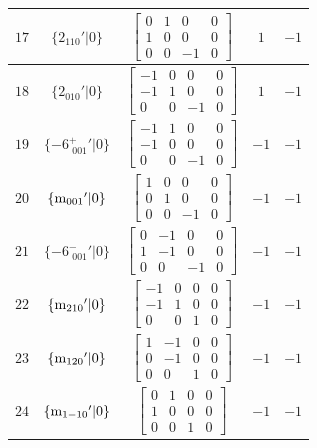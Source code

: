 \documentclass[fleqn,8pt]{jsarticle}
\begin{document}
\begin{longtable}{ccccc}
$ 17 $ & $ \{2{}_{110}{}'|0\} $ & $ \begin{bmatrix} 0 & 1 & 0 & 0 \\ 1 & 0 & 0 & 0 \\ 0 & 0 & -1 & 0 \end{bmatrix} $ & $ 1 $ & $ -1 $ \\ \hline
$ 18 $ & $ \{2{}_{010}{}'|0\} $ & $ \begin{bmatrix} -1 & 0 & 0 & 0 \\ -1 & 1 & 0 & 0 \\ 0 & 0 & -1 & 0 \end{bmatrix} $ & $ 1 $ & $ -1 $ \\ \hline
$ 19 $ & $ \{-6^{+}_{\,\,001}{}'|0\} $ & $ \begin{bmatrix} -1 & 1 & 0 & 0 \\ -1 & 0 & 0 & 0 \\ 0 & 0 & -1 & 0 \end{bmatrix} $ & $ -1 $ & $ -1 $ \\ \hline
$ 20 $ & $ \{{\rm m}_{001}{}'|0\} $ & $ \begin{bmatrix} 1 & 0 & 0 & 0 \\ 0 & 1 & 0 & 0 \\ 0 & 0 & -1 & 0 \end{bmatrix} $ & $ -1 $ & $ -1 $ \\ \hline
$ 21 $ & $ \{-6^{-}_{\,\,001}{}'|0\} $ & $ \begin{bmatrix} 0 & -1 & 0 & 0 \\ 1 & -1 & 0 & 0 \\ 0 & 0 & -1 & 0 \end{bmatrix} $ & $ -1 $ & $ -1 $ \\ \hline
$ 22 $ & $ \{{\rm m}_{210}{}'|0\} $ & $ \begin{bmatrix} -1 & 0 & 0 & 0 \\ -1 & 1 & 0 & 0 \\ 0 & 0 & 1 & 0 \end{bmatrix} $ & $ -1 $ & $ -1 $ \\ \hline
$ 23 $ & $ \{{\rm m}_{120}{}'|0\} $ & $ \begin{bmatrix} 1 & -1 & 0 & 0 \\ 0 & -1 & 0 & 0 \\ 0 & 0 & 1 & 0 \end{bmatrix} $ & $ -1 $ & $ -1 $ \\ \hline
$ 24 $ & $ \{{\rm m}_{1-10}{}'|0\} $ & $ \begin{bmatrix} 0 & 1 & 0 & 0 \\ 1 & 0 & 0 & 0 \\ 0 & 0 & 1 & 0 \end{bmatrix} $ & $ -1 $ & $ -1 $ \\
\end{longtable}
\end{document}
